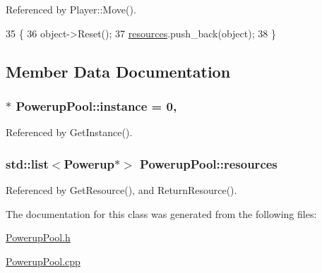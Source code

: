 Referenced by Player\-::\-Move().


\begin{DoxyCode}
35 \{
36     \textcolor{keywordtype}{object}->Reset();
37     \hyperlink{class_powerup_pool_a4d1fbbe9744bd3db681131aa65d20894}{resources}.push\_back(\textcolor{keywordtype}{object});
38 \}
\end{DoxyCode}


\subsection{Member Data Documentation}
\hypertarget{class_powerup_pool_a938f69e1e01e79d883313082e9cd83bf}{
\subsubsection[{instance}]{ $\ast$ Powerup\-Pool\-::instance = 0\hspace{0.3cm}{\ttfamily [static]}, {\ttfamily [private]}}}\label{class_powerup_pool_a938f69e1e01e79d883313082e9cd83bf}


Referenced by Get\-Instance().

\hypertarget{class_powerup_pool_a4d1fbbe9744bd3db681131aa65d20894}{
\subsubsection[{resources}]{\setlength{\rightskip}{0pt plus 5cm}std\-::list$<${\bf Powerup}$\ast$$>$ Powerup\-Pool\-::resources\hspace{0.3cm}{\ttfamily [private]}}}\label{class_powerup_pool_a4d1fbbe9744bd3db681131aa65d20894}


Referenced by Get\-Resource(), and Return\-Resource().



The documentation for this class was generated from the following files\-:\begin{DoxyCompactItemize}
\item 
\hyperlink{_powerup_pool_8h}{Powerup\-Pool.\-h}\item 
\hyperlink{_powerup_pool_8cpp}{Powerup\-Pool.\-cpp}\end{DoxyCompactItemize}
